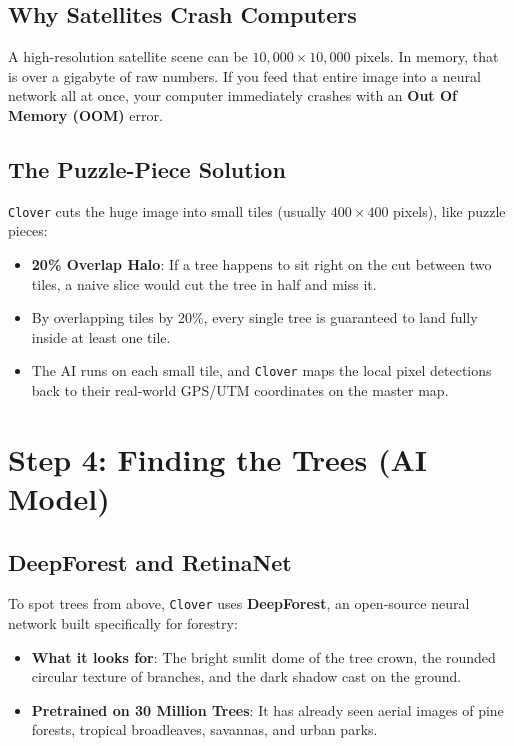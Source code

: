\documentclass[11pt,a4paper]{article}
\begin{document}
\subsection{Why Satellites Crash Computers}
A high-resolution satellite scene can be $10,000 \times 10,000$ pixels. In memory, that is over a gigabyte of raw numbers. If you feed that entire image into a neural network all at once, your computer immediately crashes with an \textbf{Out Of Memory (OOM)} error.

\subsection{The Puzzle-Piece Solution}
\texttt{Clover} cuts the huge image into small tiles (usually $400 \times 400$ pixels), like puzzle pieces:
\begin{itemize}
    \item \textbf{20\% Overlap Halo}: If a tree happens to sit right on the cut between two tiles, a naive slice would cut the tree in half and miss it.
    \item By overlapping tiles by 20\%, every single tree is guaranteed to land fully inside at least one tile.
    \item The AI runs on each small tile, and \texttt{Clover} maps the local pixel detections back to their real-world GPS/UTM coordinates on the master map.
\end{itemize}

\section{Step 4: Finding the Trees (AI Model)}

\subsection{DeepForest and RetinaNet}
To spot trees from above, \texttt{Clover} uses \textbf{DeepForest}, an open-source neural network built specifically for forestry:
\begin{itemize}
    \item \textbf{What it looks for}: The bright sunlit dome of the tree crown, the rounded circular texture of branches, and the dark shadow cast on the ground.
    \item \textbf{Pretrained on 30 Million Trees}: It has already seen aerial images of pine forests, tropical broadleaves, savannas, and urban parks.
\end{itemize}
\end{document}
